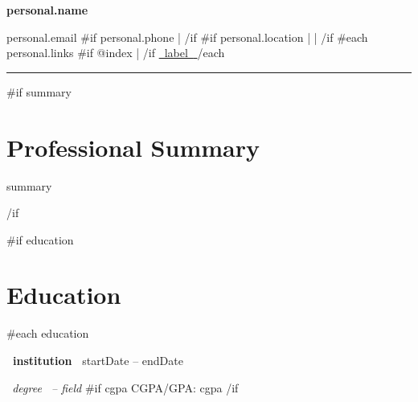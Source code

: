 \documentclass[10pt,a4paper]{article}
\begin{document}
\color{darktext}

\begin{center}

    {\fontsize{22}{25}\selectfont
    \bfseries\color{navy}
    {{personal.name}}
    \par}

    \vspace{2pt}

    {\small
    {{personal.email}}
    {{#if personal.phone}}
    \enspace | 
    {{/if}}
    {{#if personal.location}}
    \enspace | 
    \enspace | \enspace 
    {{/if}}
    {{#each personal.links}}
    {{#if @index}}
    \enspace | \enspace
    {{/if}}
    \href{ {{~url~}} }{ {{~label~}} }
    {{/each}}
    \par}

\end{center}

\nointerlineskip
{\color{navy}\rule{\textwidth}{1.1pt}}
\par
\vspace{2pt}

{{#if summary}}
\section{Professional Summary}

{{summary}}

{{/if}}

{{#if education}}
\section{Education}

{{#each education}}

\textbf{ {{~institution~}} }
\hfill
{\small\color{muted}
{{startDate}} -- {{endDate}}
}

\par

\textit{ {{~degree~}} -- {{field}} }
{{#if cgpa}}
\hfill
{\small CGPA/GPA: {{cgpa}} }
{{/if}}
\par
\end{document}
